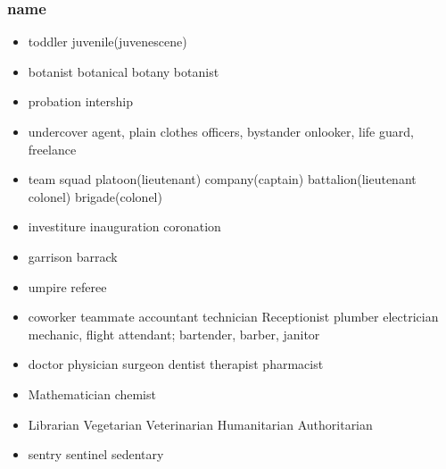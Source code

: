 \documentclass[a4paper,11pt,twoside]{book}
\begin{document}
\subsubsection{name}
\begin{itemize}

	\item toddler juvenile(juvenescene)
	
	\item botanist botanical botany botanist
	
	\item probation intership
	
	\item undercover agent, plain clothes officers, bystander onlooker, life guard, freelance

	\item team squad platoon(lieutenant) company(captain) battalion(lieutenant colonel) brigade(colonel)

	\item investiture inauguration coronation

	\item garrison barrack

	\item umpire referee

	\item coworker teammate accountant technician Receptionist plumber electrician mechanic, flight attendant; bartender, barber, janitor

	\item doctor physician surgeon dentist therapist pharmacist

	\item Mathematician chemist  
	
	\item Librarian Vegetarian Veterinarian Humanitarian Authoritarian

	\item sentry sentinel sedentary
\end{itemize}
	
\end{document}

